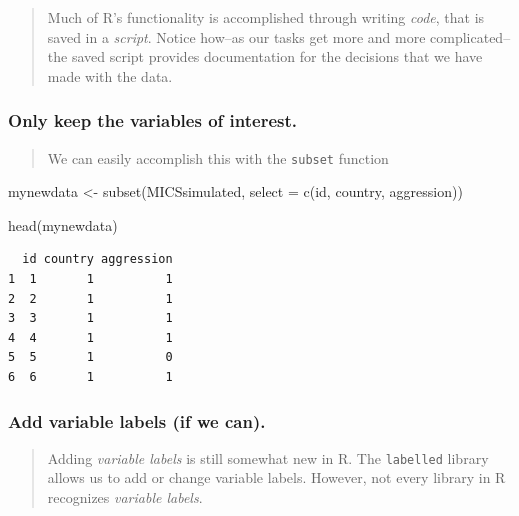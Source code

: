 \documentclass[
  letterpaper,
  DIV=11,
  numbers=noendperiod]{scrreprt}
\newenvironment{Shaded}{\begin{snugshade}}{\end{snugshade}}
\newcommand{\AttributeTok}[1]{\textcolor[rgb]{0.40,0.45,0.13}{#1}}
\newcommand{\FunctionTok}[1]{\textcolor[rgb]{0.28,0.35,0.67}{#1}}
\newcommand{\NormalTok}[1]{\textcolor[rgb]{0.00,0.23,0.31}{#1}}
\newcommand{\OtherTok}[1]{\textcolor[rgb]{0.00,0.23,0.31}{#1}}
\begin{document}
\begin{quote}
Much of R's functionality is accomplished through writing \emph{code},
that is saved in a \emph{script}. Notice how--as our tasks get more and
more complicated--the saved script provides documentation for the
decisions that we have made with the data.
\end{quote}

\hypertarget{sec-onlykeep}{%
\subsubsection{Only keep the variables of
interest.}\label{sec-onlykeep}}

\begin{quote}
We can easily accomplish this with the \texttt{subset} function
\end{quote}

\begin{Shaded}
\begin{Highlighting}[]
\NormalTok{mynewdata }\OtherTok{\textless{}{-}} \FunctionTok{subset}\NormalTok{(MICSsimulated,}
                    \AttributeTok{select =} \FunctionTok{c}\NormalTok{(id, country, aggression))}
\end{Highlighting}
\end{Shaded}

\begin{Shaded}
\begin{Highlighting}[]
\FunctionTok{head}\NormalTok{(mynewdata)}
\end{Highlighting}
\end{Shaded}

\begin{verbatim}
  id country aggression
1  1       1          1
2  2       1          1
3  3       1          1
4  4       1          1
5  5       1          0
6  6       1          1
\end{verbatim}

\hypertarget{sec-addvarlabels}{%
\subsubsection{Add variable labels (if we
can).}\label{sec-addvarlabels}}

\begin{quote}
Adding \emph{variable labels} is still somewhat new in R. The
\texttt{labelled} library allows us to add or change variable labels.
However, not every library in R recognizes \emph{variable labels}.
\end{quote}
\end{document}
